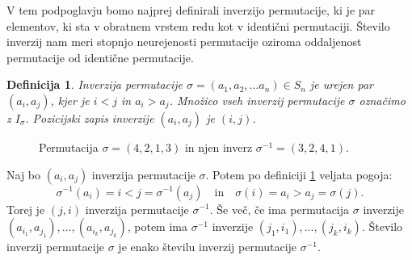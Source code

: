 \documentclass[a4paper, 12pt]{book}
\newtheorem{definicija}{Definicija}[chapter]
\begin{document}
V tem podpoglavju bomo najprej definirali inverzijo permutacije, ki je par elementov, ki sta v obratnem vrstem redu kot v identični permutaciji. Število inverzij nam meri stopnjo neurejenosti permutacije oziroma oddaljenost permutacije od identične permutacije. 

\begin{definicija}
\label{definicija_inverzije}
    Inverzija permutacije $\sigma = (a_1, a_2,\dots a_n) \in S_n$ je urejen par $(a_i, a_j)$, kjer je $i < j$ in $a_i > a_j$. Množico vseh inverzij permutacije $\sigma$ označimo z $I_{\sigma}$. Pozicijski zapis inverzije $(a_i, a_j)$ je $(i, j)$.
\end{definicija}

\begin{figure}[h]
    \begin{center}
    \end{center}
    \caption{Permutacija $\sigma = (4, 2, 1, 3)$ in njen inverz $\sigma^{-1} = (3, 2, 4, 1)$.}
    \label{permutacija_4213}
\end{figure}

Naj bo $(a_i, a_j)$ inverzija permutacije $\sigma$. Potem po definiciji \ref{definicija_inverzije} veljata pogoja: 
\[
    \sigma^{-1}(a_i) = i < j = \sigma^{-1}(a_j) \quad \text{in} \quad \sigma(i) = a_i > a_j = \sigma(j).
\]
Torej je $(j, i)$ inverzija permutacije $\sigma^{-1}$.
Še več, če ima permutacija $\sigma$ inverzije $(a_{i_1}, a_{j_1}), \dots, (a_{i_k}, a_{j_k})$, potem ima $\sigma^{-1}$ inverzije $(j_1, i_1), \dots, (j_k, i_k)$. 
Število inverzij permutacije $\sigma$ je enako številu inverzij permutacije $\sigma^{-1}$.
\end{document}
